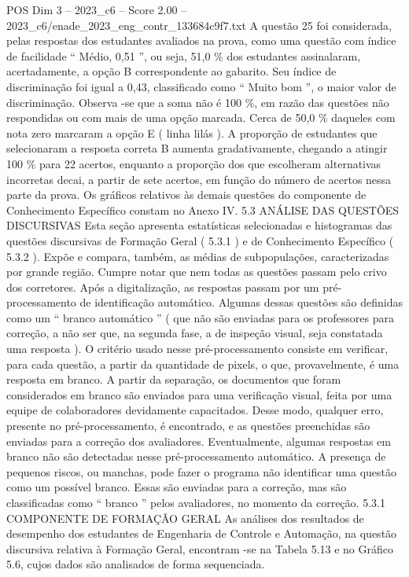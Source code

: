 \begin{textsample}{POS Dim 3 – 2023\_c6 – Score 2.00 – 2023\_c6/enade\_2023\_eng\_contr\_133684c9f7.txt}
A questão 25 foi considerada, pelas respostas dos estudantes avaliados na prova, como uma questão com índice de facilidade “ Médio, 0,51 ”, ou seja, 51,0 \% dos estudantes assinalaram, acertadamente, a opção B correspondente ao gabarito.
Seu índice de discriminação foi igual a 0,43, classificado como “ Muito bom ”, o maior valor de discriminação.
Observa -se que a soma não é 100 \%, em razão das questões não respondidas ou com mais de uma opção marcada.
Cerca de 50,0 \% daqueles com nota zero marcaram a opção E ( linha lilás ).
A proporção de estudantes que selecionaram a resposta correta B aumenta gradativamente, chegando a atingir 100 \% para 22 acertos, enquanto a proporção dos que escolheram alternativas incorretas decai, a partir de sete acertos, em função do número de acertos nessa parte da prova.
Os gráficos relativos às demais questões do componente de Conhecimento Específico constam no Anexo IV. 5.3 ANÁLISE DAS QUESTÕES DISCURSIVAS Esta seção apresenta estatísticas selecionadas e histogramas das questões discursivas de Formação Geral ( 5.3.1 ) e de Conhecimento Específico ( 5.3.2 ).
Expõe e compara, também, as médias de subpopulações, caracterizadas por grande região.
Cumpre notar que nem todas as questões passam pelo crivo dos corretores.
Após a digitalização, as respostas passam por um pré-processamento de identificação automático.
Algumas dessas questões são definidas como um “ branco automático ” ( que não são enviadas para os professores para correção, a não ser que, na segunda fase, a de inspeção visual, seja constatada uma resposta ).
O critério usado nesse pré-processamento consiste em verificar, para cada questão, a partir da quantidade de pixels, o que, provavelmente, é uma resposta em branco.
A partir da separação, os documentos que foram considerados em branco são enviados para uma verificação visual, feita por uma equipe de colaboradores devidamente capacitados.
Desse modo, qualquer erro, presente no pré-processamento, é encontrado, e as questões preenchidas são enviadas para a correção dos avaliadores.
Eventualmente, algumas respostas em branco não são detectadas nesse pré-processamento automático.
A presença de pequenos riscos, ou manchas, pode fazer o programa não identificar uma questão como um possível branco.
Essas são enviadas para a correção, mas são classificadas como “ branco ” pelos avaliadores, no momento da correção. 5.3.1 COMPONENTE DE FORMAÇÃO GERAL As análises dos resultados de desempenho dos estudantes de Engenharia de Controle e Automação, na questão discursiva relativa à Formação Geral, encontram -se na Tabela 5.13 e no Gráfico 5.6, cujos dados são analisados de forma sequenciada.

\end{textsample}
